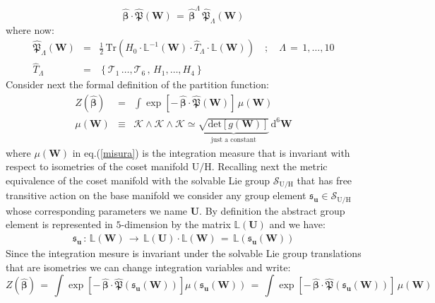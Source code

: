 \documentclass[10pt,a4paper]{article}
\newcommand{\ft}[2]{{\textstyle\frac{#1}{#2}}}
\begin{document}
\begin{equation}\label{merovingio}
  \widehat{\boldsymbol{\beta}}\cdot \widehat{\boldsymbol{\mathfrak{P}}}(\mathbf{W})\, = \, \widehat{\boldsymbol{\beta}}^\Lambda \, \widehat{\boldsymbol{\mathfrak{P}}}_\Lambda(\mathbf{W})
\end{equation}
where now:
\begin{eqnarray}\label{polifonico}
  \widehat{\boldsymbol{\mathfrak{P}}}_\Lambda(\mathbf{W})& = &\ft 12 \, \text{Tr} \left(H_{0} \cdot
  \mathbb{L}^{-1}(\mathbf{W})\cdot \widehat{T}_\Lambda \cdot \mathbb{L}(\mathbf{W}) \right) \quad ; \quad \Lambda\, = \, 1,\dots,10 \nonumber\\
  \widehat{T}_\Lambda & = & \left\{ \mathcal{T}_1 \, \dots , \mathcal{T}_6\, , \, H_1,\dots, H_4\right\}
\end{eqnarray}
Consider next the formal definition of the partition function:
\begin{eqnarray}
  Z(\widehat{\boldsymbol{\beta}}) & = & \int \exp\left[ -\,\widehat{\boldsymbol{\beta}}\cdot \widehat{\boldsymbol{\mathfrak{P}}}(\mathbf{W})\right]\, \mu(\mathbf{W})\label{spartito}\\
   \mu(\mathbf{W}) & \equiv & \boldsymbol{\mathcal{K}} \wedge \boldsymbol{\mathcal{K}} \wedge \boldsymbol{\mathcal{K}} \simeq \underbrace{\sqrt{\text{det}\left[g(\mathbf{\mathbf{W}})\right]}}_{\text{just a constant}} \, \mathrm{d}^6 \mathbf{W} \label{misura}
\end{eqnarray}
where $\mu(\mathbf{W}) $ in eq.(\ref{misura}) is the integration measure that is invariant with respect to isometries of the coset manifold $\mathrm{U/H}$. Recalling next the metric equivalence of the coset manifold with the solvable Lie
group $\mathcal{S}_{\mathrm{U/H}}$ that has free transitive action on the base manifold we consider any group element $\mathfrak{s}_\mathbf{u}\in \mathcal{S}_{\mathrm{U/H}}$ whose corresponding parameters we name $\mathbf{U}$.
By definition the abstract group element is represented in $5$-dimension by the matrix $\mathbb{L}(\mathbf{U})$ and we have:
\begin{eqnarray}\label{corellus}
  \mathfrak{s}_\mathbf{u} \, : \, \mathbb{L}(\mathbf{W}) \, \longrightarrow \, \mathbb{L}(\mathbf{U})\cdot \mathbb{L}(\mathbf{W}) \, = \, \mathbb{L}\left(\mathfrak{s}_\mathbf{u}(\mathbf{W})\right)
\end{eqnarray}
Since the integration mesure is invariant under the solvable Lie group translations that are isometries we can change integration variables and write:
\begin{equation}\label{canellone}
  Z(\widehat{\boldsymbol{\beta}}) \, = \, \int \exp\left[ -\,\widehat{\boldsymbol{\beta}}\cdot \widehat{\boldsymbol{\mathfrak{P}}}(\mathfrak{s}_\mathbf{u}(\mathbf{W}))\right] \mu(\mathfrak{s}_\mathbf{u}(\mathbf{W})) \, = \, \int \exp\left[ -\,\widehat{\boldsymbol{\beta}}\cdot \widehat{\boldsymbol{\mathfrak{P}}}(\mathfrak{s}_\mathbf{u}(\mathbf{W}))\right]\, \mu(\mathbf{W})
\end{equation}
\end{document}
